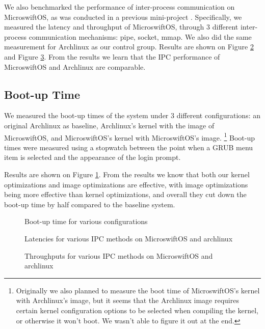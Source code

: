 We also benchmarked the performance of inter-process communication on MicroswiftOS, as was conducted in a previous mini-project \cite{mini}. Specifically, we measured the latency and throughput of MicroswiftOS, through $3$ different inter-process communication mechanisms: pipe, socket, mmap. We also did the same measurement for Archlinux as our control group. Results are shown on Figure \ref{figure:latency} and Figure \ref{figure:throughput}. From the results we learn that the IPC performance of MicroswiftOS and Archlinux are comparable.

\subsection{Boot-up Time}

We measured the boot-up times of the system under $3$ different configurations: an original Archlinux as baseline, Archlinux's kernel with the image of MicroswiftOS, and MicroswiftOS's kernel with MicroswiftOS's image.
\footnote{Originally we also planned to measure the boot time of MicroswiftOS's kernel with Archlinux's image, but it seems that the Archlinux image requires certain kernel configuration options to be selected when compiling the kernel, or otherwise it won't boot.
We wasn't able to figure it out at the end.}
Boot-up times were measured using a stopwatch between the point when a GRUB menu item is selected and the appearance of the login prompt.

Results are shown on Figure \ref{figure:eval}. From the results we know that both our kernel optimizations and image optimizations are effective, with image optimizations being more effective than kernel optimizations, and overall they cut down the boot-up time by half compared to the baseline system.

\begin{figure}[!htb]
\centering
{}
\caption{Boot-up time for various configurations}
\label{figure:eval}
\end{figure}
\begin{figure}[!htb]
\centering
{}
\caption{Latencies for various IPC methods on MicroswiftOS and archlinux}
\label{figure:latency}
\end{figure}
\begin{figure}[!htb]
\centering
{}
\caption{Throughputs for various IPC methods on MicroswiftOS and archlinux}
\label{figure:throughput}
\end{figure}


